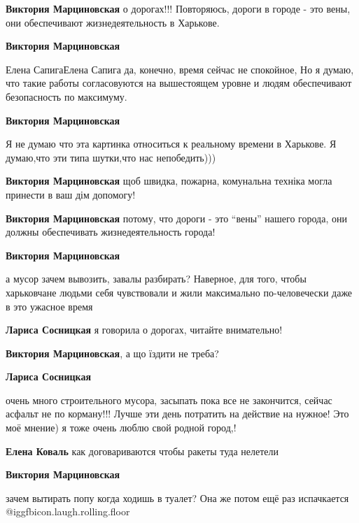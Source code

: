 \begin{multicols}{2}
\begin{itemize}
\begin{itemize}
\textbf{Виктория Марциновская} о дорогах!!! Повторяюсь, дороги в городе - это вены, они обеспечивают жизнедеятельность в Харькове.

\textbf{Виктория Марциновская} 

Елена СапигаЕлена Сапига да, конечно, время сейчас не спокойное, Но я думаю,
что такие работы согласовуются на вышестоящем уровне и людям обеспечивают
безопасность по максимуму.

\end{itemize} %

\textbf{Виктория Марциновская} 

Я не думаю что эта картинка относиться к реальному времени в Харькове. Я
думаю,что эти типа шутки,что нас непобедить)))

\textbf{Виктория Марциновская} щоб швидка, пожарна, комунальна техніка могла принести в ваш дім допомогу!

\textbf{Виктория Марциновская} потому, что дороги - это \enquote{вены} нашего города, они должны обеспечивать жизнедеятельность города!

\textbf{Виктория Марциновская} 

а мусор зачем вывозить, завалы разбирать? Наверное, для того, чтобы харьковчане
людьми себя чувствовали и жили максимально по-человечески даже в это ужасное
время

\begin{itemize} %
\textbf{Лариса Сосницкая} я говорила о дорогах, читайте внимательно!

\textbf{Виктория Марциновская}, а що їздити не треба?

\textbf{Лариса Сосницкая} 

очень много строительного мусора, засыпать пока все не закончится, сейчас
асфальт не по корману!!! Лучше эти день потратить на действие на нужное! Это
моё мнение) я тоже очень люблю свой родной город,!

\end{itemize} %

\textbf{Елена Коваль} как договариваются чтобы ракеты туда нелетели

\textbf{Виктория Марциновская} 

зачем вытирать попу когда ходишь в туалет? Она же потом ещё раз испачкается
@igg{fbicon.laugh.rolling.floor} 



\end{itemize}
\end{multicols}

